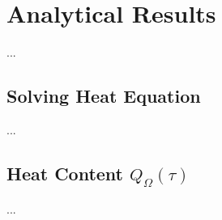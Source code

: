 \section{Analytical Results}

...


\subsection{Solving Heat Equation}


...


\subsection{Heat Content $Q_{\Omega}(\tau)$}


...





